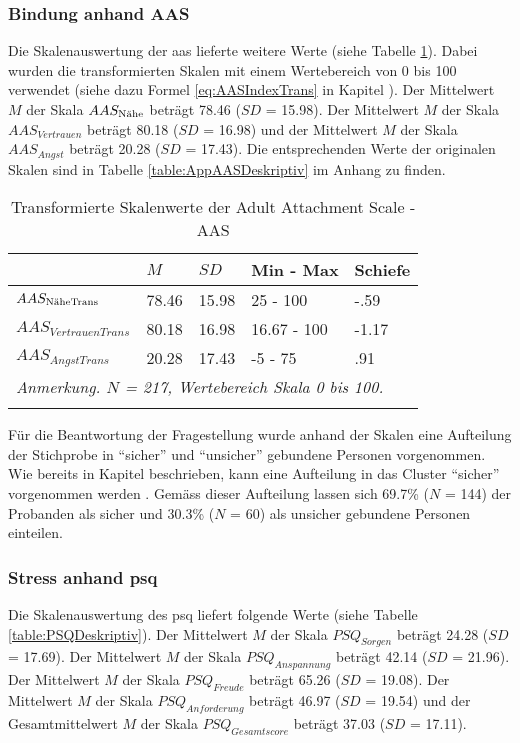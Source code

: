 \subsubsection{Bindung anhand AAS}
Die Skalenauswertung der \acrfull{aas} lieferte weitere Werte (siehe Tabelle \ref{table:AASDeskriptivTrans}). Dabei wurden die transformierten Skalen mit einem Wertebereich von 0 bis 100 verwendet (siehe dazu Formel \ref{eq:AASIndexTrans} in Kapitel \textit{}). Der Mittelwert $M$ der Skala $AAS_{\textnormal{Nähe}}$ beträgt 78.46 ($SD$ = 15.98). Der Mittelwert $M$ der Skala $AAS_{Vertrauen}$ beträgt 80.18 ($SD$ = 16.98) und der Mittelwert  $M$ der Skala $AAS_{Angst}$ beträgt 20.28 ($SD$ = 17.43). Die entsprechenden Werte der originalen Skalen sind in Tabelle \ref{table:AppAASDeskriptiv} im Anhang zu finden.

\begin{table}%
\begin{tabular}{m{7em} m{3em}  m{3em}  m{5em} m{3em}} 
  \hline
  & $M$ & $SD$ & Min - Max & Schiefe\\
  \hline
  $AAS_{\textit{\textnormal{NäheTrans}}}$ & 78.46 & 15.98 & 25 - 100 & -.59\\
  $AAS_{VertrauenTrans}$ & 80.18 & 16.98 & 16.67 - 100 & -1.17\\
  $AAS_{AngstTrans}$ & 20.28 & 17.43 & -5 - 75 & .91 \\
  \hline
  \multicolumn{5}{l}{\textit{Anmerkung. $N$ = 217, Wertebereich Skala 0 bis 100.}}\\
  &&&&\\
\end{tabular}
\caption{Transformierte Skalenwerte der Adult Attachment Scale - AAS}
\label{table:AASDeskriptivTrans}
\end{table}

Für die Beantwortung der Fragestellung wurde anhand der Skalen eine Aufteilung der Stichprobe in \enquote{sicher} und \enquote{unsicher} gebundene Personen vorgenommen. Wie bereits in Kapitel \textit{} beschrieben, kann eine Aufteilung in das Cluster \enquote{sicher} vorgenommen werden \cite{Schuetzmann2004}. Gemäss dieser Aufteilung lassen sich 69.7\% ($N$ = 144) der Probanden als sicher und 30.3\% ($N$ = 60) als unsicher gebundene Personen einteilen. 

\subsubsection{Stress anhand \acrshort{psq}}
Die Skalenauswertung des \acrfull{psq} liefert folgende Werte (siehe Tabelle \ref{table:PSQDeskriptiv}). Der Mittelwert $M$ der Skala $PSQ_{Sorgen}$ beträgt 24.28 ($SD$ = 17.69). Der Mittelwert $M$ der Skala $PSQ_{Anspannung}$ beträgt 42.14 ($SD$ = 21.96). Der Mittelwert $M$ der Skala $PSQ_{Freude}$ beträgt 65.26 ($SD$ = 19.08). Der Mittelwert $M$ der Skala $PSQ_{Anforderung}$ beträgt 46.97 ($SD$ = 19.54) und der Gesamtmittelwert $M$ der Skala $PSQ_{Gesamtscore}$ beträgt 37.03 ($SD$ = 17.11).

